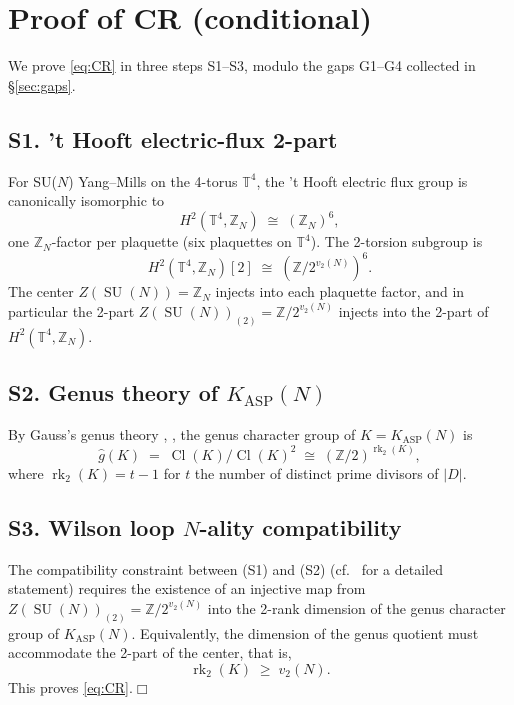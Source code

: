 \documentclass[11pt,a4paper,reqno]{amsart}
\theoremstyle{definition}
\DeclareMathOperator{\SU}{SU}
\DeclareMathOperator{\Cl}{Cl}
\DeclareMathOperator{\rk}{rk}
\newcommand{\KASP}{K_{\mathrm{ASP}}}
\newcommand{\ZZ}{\mathbb{Z}}
\newcommand{\TT}{\mathbb{T}}
\newcommand{\vtwo}{v_2}
\begin{document}
\section{Proof of CR (conditional)}\label{sec:CR-proof}

We prove \eqref{eq:CR} in three steps S1--S3, modulo the gaps G1--G4 collected
in \S\ref{sec:gaps}.

\subsection*{S1. 't Hooft electric-flux 2-part}

For SU($N$) Yang--Mills on the 4-torus $\TT^4$, the 't Hooft electric flux
group \cite{tHooft1979} is canonically isomorphic to
\[
  H^2(\TT^4, \ZZ_N) \;\cong\; (\ZZ_N)^6,
\]
one $\ZZ_N$-factor per plaquette (six plaquettes on $\TT^4$). The 2-torsion
subgroup is
\[
  H^2(\TT^4, \ZZ_N)[2] \;\cong\; (\ZZ/2^{\vtwo(N)})^6.
\]
The center $Z(\SU(N))=\ZZ_N$ injects into each plaquette factor, and in
particular the 2-part $Z(\SU(N))_{(2)} = \ZZ/2^{\vtwo(N)}$ injects into the
2-part of $H^2(\TT^4, \ZZ_N)$.

\subsection*{S2. Genus theory of $\KASP(N)$}

By Gauss's genus theory \cite[\S\S 246--262]{Gauss1801}, \cite[Thm.~7.7]{Cox1989}, the genus character group of $K=\KASP(N)$ is
\[
  \widehat{g}(K) \;=\; \Cl(K)/\Cl(K)^2 \;\cong\; (\ZZ/2)^{\rk_2(K)},
\]
where $\rk_2(K) = t-1$ for $t$ the number of distinct prime divisors of $|D|$.

\subsection*{S3. Wilson loop $N$-ality compatibility}

The compatibility constraint between (S1) and (S2) (cf.\ \cite{Remondiere2026Selberg} for a detailed statement) requires the existence of an injective
map from $Z(\SU(N))_{(2)} = \ZZ/2^{\vtwo(N)}$ into the 2-rank dimension of
the genus character group of $\KASP(N)$. Equivalently, the dimension of the
genus quotient must accommodate the 2-part of the center, that is,
\[
  \rk_2(K) \;\ge\; \vtwo(N).
\]
This proves \eqref{eq:CR}.\hfill$\Box$

\end{document}

